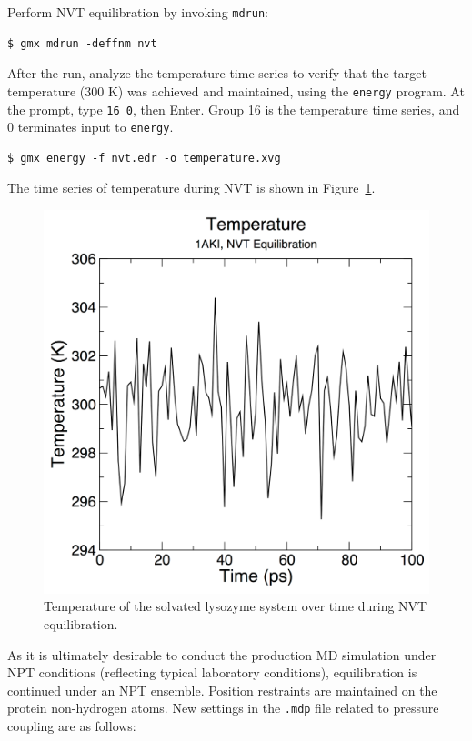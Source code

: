 \documentclass[9pt,tutorial]{livecoms}
\begin{document}
Perform NVT equilibration by invoking \texttt{mdrun}:

\begin{verbatim}
$ gmx mdrun -deffnm nvt
\end{verbatim}

After the run, analyze the temperature time series to verify that the target temperature (300 K) was achieved and maintained, using the \texttt{energy} program. At the prompt, type \texttt{16 0}, then Enter. Group 16 is the temperature time series, and 0 terminates input to \texttt{energy}.

\begin{verbatim}
$ gmx energy -f nvt.edr -o temperature.xvg
\end{verbatim}

The time series of temperature during NVT is shown in Figure~\ref{lyso_nvt_temp_fig}.

\begin{figure}[h]
\centering
\includegraphics{plot_lyso_nvt_temperature}
\caption{Temperature of the solvated lysozyme system over time during NVT equilibration.}
\label{lyso_nvt_temp_fig}
\end{figure}

As it is ultimately desirable to conduct the production MD simulation under NPT conditions (reflecting typical laboratory conditions), equilibration is continued under an NPT ensemble. Position restraints are maintained on the protein non-hydrogen atoms. New settings in the \texttt{.mdp} file related to pressure coupling are as follows:
\end{document}
